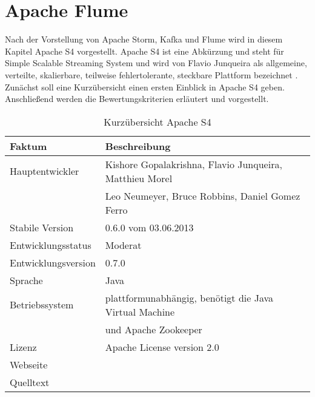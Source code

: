 \section{Apache Flume}


Nach der Vorstellung von Apache Storm, Kafka und Flume wird in diesem Kapitel Apache S4 vorgestellt. Apache S4 ist eine Abkürzung und steht für Simple Scalable Streaming System und wird von Flavio Junqueira als allgemeine, verteilte, skalierbare, teilweise fehlertolerante, steckbare Plattform bezeichnet . Zunächst soll eine Kurzübersicht einen ersten Einblick in Apache S4 geben. Anschließend werden die Bewertungskriterien erläutert und vorgestellt.

\begin{table}[tbp]
	\centering
		\begin{tabular}{@{}ll@{}} \toprule
			\textbf{Faktum} & \textbf{Beschreibung} \\ \midrule
			Hauptentwickler & Kishore Gopalakrishna, Flavio Junqueira, Matthieu Morel \\
			& Leo Neumeyer, Bruce Robbins, Daniel Gomez Ferro \\
			Stabile Version & 0.6.0 vom 03.06.2013 \\ 
			Entwicklungsstatus &  Moderat \\
			Entwicklungsversion & 0.7.0 \\
			Sprache & Java \\
			Betriebssystem & plattformunabhängig, benötigt die Java Virtual Machine \\
			& und Apache Zookeeper \\
			Lizenz & Apache License version 2.0 \\
			Webseite & \citeint{s4:home} \\
			Quelltext & \citeint{s4:GitHubApacheMirror} \\			
			\bottomrule			
		\end{tabular}
	\caption{Kurzübersicht Apache S4}
	\label{tab:vors4}
\end{table}